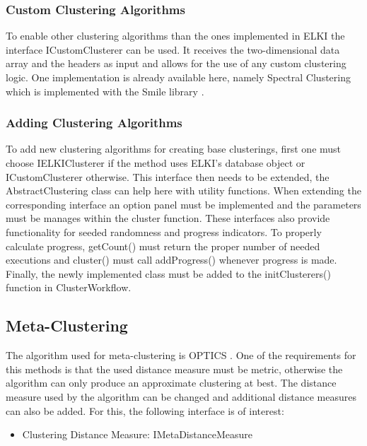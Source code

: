 \documentclass[
	a4paper,
	english,
	twoside,
	openright,               
	11pt                            
	]{report}
\begin{document}
\subsubsection{Custom Clustering Algorithms}
To enable other clustering algorithms than the ones implemented in ELKI the interface ICustomClusterer can be used. It receives the two-dimensional data array and the headers as input and allows for the use of any custom clustering logic. One implementation is already available here, namely Spectral Clustering which is implemented with the Smile library \cite{javasmile}.
 
\subsubsection*{Adding Clustering Algorithms}
To add new clustering algorithms for creating base clusterings, first one must choose IELKIClusterer if the method uses ELKI's database object or ICustomClusterer otherwise. This interface then needs to be extended, the AbstractClustering class can help here with utility functions. When extending the corresponding interface an option panel must be implemented and the parameters must be manages within the cluster function. These interfaces also provide functionality for seeded randomness and progress indicators. To properly calculate progress, getCount() must return the proper number of needed executions and cluster() must call addProgress() whenever progress is made. Finally, the newly implemented class must be added to the initClusterers() function in ClusterWorkflow.


\subsection{Meta-Clustering}
The algorithm used for meta-clustering is OPTICS \cite{10.1145/304181.304187}. One of the requirements for this methods is that the used distance measure must be metric, otherwise the algorithm can only produce an approximate clustering at best. The distance measure used by the algorithm can be changed and additional distance measures can also be added. For this, the following interface is of interest:

\begin{itemize}
  \item Clustering Distance Measure: IMetaDistanceMeasure
\end{itemize}
\end{document}
